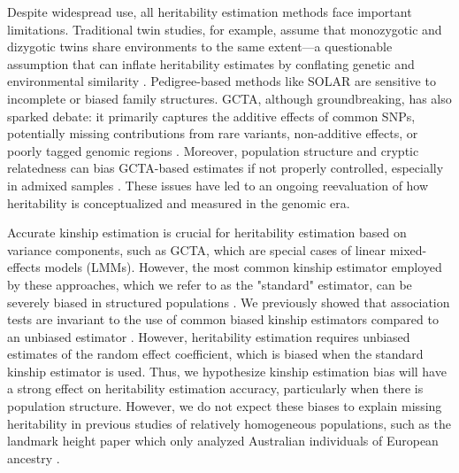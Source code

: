 \documentclass[11pt]{article}
\begin{document}
Despite widespread use, all heritability estimation methods face important limitations. Traditional twin studies, for example, assume that monozygotic and dizygotic twins share environments to the same extent—a questionable assumption that can inflate heritability estimates by conflating genetic and environmental similarity \citep{tenesa2013heritability, charney2012behavior}. Pedigree-based methods like SOLAR are sensitive to incomplete or biased family structures. GCTA, although groundbreaking, has also sparked debate: it primarily captures the additive effects of common SNPs, potentially missing contributions from rare variants, non-additive effects, or poorly tagged genomic regions \citep{speed2012improved,speed2017reevaluation, zaitlen2013using,yang2017concepts}. 
Moreover, population structure and cryptic relatedness can bias GCTA-based estimates if not properly controlled, especially in admixed samples \citep{price2010new,yang2017concepts}.
These issues have led to an ongoing reevaluation of how heritability is conceptualized and measured in the genomic era. 

Accurate kinship estimation is crucial for heritability estimation based on variance components, such as GCTA, which are special cases of linear mixed-effects models (LMMs). However, the most common kinship estimator employed by these approaches, which we refer to as the "standard" estimator, can be severely biased in structured populations \citep{ochoa_estimating_2021}. We previously showed that association tests are invariant to the use of common biased kinship estimators compared to an unbiased estimator \citep{hou2023genetic}. However, heritability estimation requires unbiased estimates of the random effect coefficient, which is biased when the standard kinship estimator is used.  Thus, we hypothesize kinship estimation bias will have a strong effect on heritability estimation accuracy, particularly when there is population structure.
However, we do not expect these biases to explain missing heritability in previous studies of relatively homogeneous populations, such as the landmark height paper which only analyzed Australian individuals of European ancestry \citep{yang_common_2010}.
\end{document}
